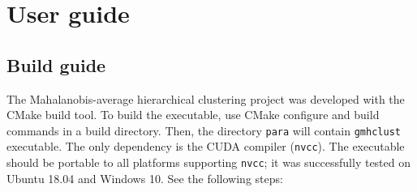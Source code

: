 \documentclass[12pt,a4paper,twoside,openright]{report}
\begin{document}



\tableofcontents














\appendix
\chapter{User guide}

\section{Build guide}

The Mahalanobis-average hierarchical clustering project was developed with the CMake build tool. To build the executable, use CMake configure and build commands in a build directory. Then, the directory \texttt{para} will contain \texttt{gmhclust} executable. The only dependency is the CUDA compiler (\texttt{nvcc}). The executable should be portable to all platforms supporting \texttt{nvcc}; it was successfully tested on Ubuntu 18.04 and Windows 10. See the following steps:
\end{document}
